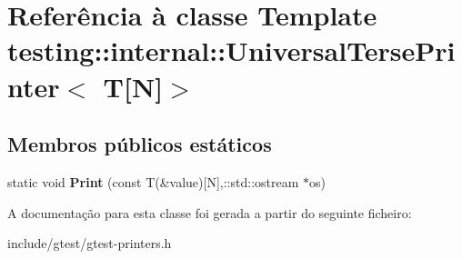\hypertarget{classtesting_1_1internal_1_1UniversalTersePrinter_3_01T[N]_4}{\section{Referência à classe Template testing\-:\-:internal\-:\-:Universal\-Terse\-Printer$<$ T\mbox{[}N\mbox{]}$>$}
\label{classtesting_1_1internal_1_1UniversalTersePrinter_3_01T[N]_4}
}
\subsection*{Membros públicos estáticos}
\begin{DoxyCompactItemize}
\item 
\hypertarget{classtesting_1_1internal_1_1UniversalTersePrinter_3_01T[N]_4_ab86be2fbff7bb8fb2113e9ade3899a56}{static void {\bfseries Print} (const T(\&value)\mbox{[}N\mbox{]},\-::std\-::ostream $\ast$os)}\label{classtesting_1_1internal_1_1UniversalTersePrinter_3_01T[N]_4_ab86be2fbff7bb8fb2113e9ade3899a56}

\end{DoxyCompactItemize}


A documentação para esta classe foi gerada a partir do seguinte ficheiro\-:\begin{DoxyCompactItemize}
\item 
include/gtest/gtest-\/printers.\-h\end{DoxyCompactItemize}
